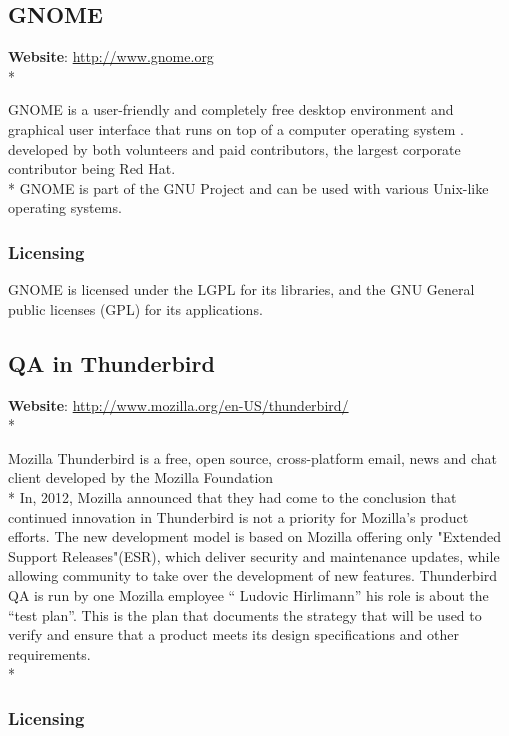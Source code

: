 \documentclass[11pt]{article} %
\begin{document}
\subsection{GNOME} %

\textbf{Website}: \url {http://www.gnome.org}\\*

GNOME is a user-friendly and completely free desktop environment and graphical user interface that runs on top of a computer operating system . developed by both volunteers and paid contributors, the largest corporate contributor being Red Hat. \\*
GNOME is part of the GNU Project and can be used with various Unix-like operating systems.

\subsubsection{Licensing}

GNOME is licensed under the LGPL for its libraries, and the GNU General public licenses (GPL) for its applications.

\subsection{QA in Thunderbird} %

\textbf{Website}: \url {http://www.mozilla.org/en-US/thunderbird/}\\*

Mozilla Thunderbird is a free, open source, cross-platform email, news and chat client developed by the Mozilla Foundation \\*
In, 2012, Mozilla announced that they had come to the conclusion that continued innovation in Thunderbird is not a priority for Mozilla’s product efforts.
 The new development model is based on Mozilla offering only "Extended Support Releases"(ESR), which deliver security and maintenance updates, while allowing community to take over the development of new features.
Thunderbird QA is run by one Mozilla employee “ Ludovic Hirlimann” his role is about the “test plan”. This is the plan that documents the strategy that will be used to verify and ensure that a product meets its design specifications and other requirements.\\*

\subsubsection{Licensing}
\end{document}
